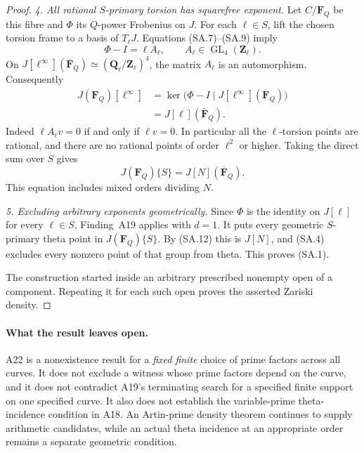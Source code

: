 \begin{proof}
\emph{4. All rational $S$-primary torsion has squarefree
exponent.}
Let $C/\mathbf F_Q$ be this fibre and
$\Phi$ its $Q$-power Frobenius on $J$.
For each $\ell\in S$, lift the chosen torsion frame to
a basis of $T_\ell J$.  Equations (SA.7)--(SA.9) imply
\[
             \Phi-I=\ell A_\ell,\qquad
                         A_\ell\in
                         \operatorname{GL}_4(\mathbf Z_\ell).
                                                               \tag{SA.10}
\]
On
$J[\ell^\infty](\overline{\mathbf F}_Q)
 \simeq(\mathbf Q_\ell/\mathbf Z_\ell)^4$,
the matrix $A_\ell$ is an automorphism.  Consequently
\[
 \begin{split}
 J(\mathbf F_Q)[\ell^\infty]
     &=\ker\bigl(\Phi-I\mid
                  J[\ell^\infty](\overline{\mathbf F}_Q)\bigr)\\
     &=J[\ell](\overline{\mathbf F}_Q).
 \end{split}                                                   \tag{SA.11}
\]
Indeed $\ell A_\ell v=0$ if and only if
$\ell v=0$.  In particular all the $\ell$-torsion
points are rational, and there are no rational points
of order $\ell^2$ or higher.  Taking the direct sum
over $S$ gives
\[
                  J(\mathbf F_Q)\{S\}
                          =J[N](\overline{\mathbf F}_Q).
                                                               \tag{SA.12}
\]
This equation includes mixed orders dividing $N$.

\emph{5. Excluding arbitrary exponents geometrically.}
Since $\Phi$ is the identity on $J[\ell]$ for every
$\ell\in S$, Finding~A19 applies with $d=1$.
It puts every geometric $S$-primary theta point in
$J(\mathbf F_Q)\{S\}$.  By (SA.12) this is $J[N]$,
and (SA.4) excludes every nonzero point of that group
from theta.  This proves (SA.1).

The construction started inside an arbitrary prescribed
nonempty open of a component.  Repeating it for each
such open proves the asserted Zariski density.
\end{proof}

\paragraph{What the result leaves open.}
A22 is a nonexistence result for a \emph{fixed finite}
choice of prime factors across all curves.  It does not
exclude a witness whose prime factors depend on the
curve, and it does not contradict A19's terminating
search for a specified finite support on one specified
curve.  It also does not establish the variable-prime
theta-incidence condition in A18.  An Artin-prime
density theorem continues to supply arithmetic
candidates, while an actual theta incidence at an
appropriate order remains a separate geometric
condition.
